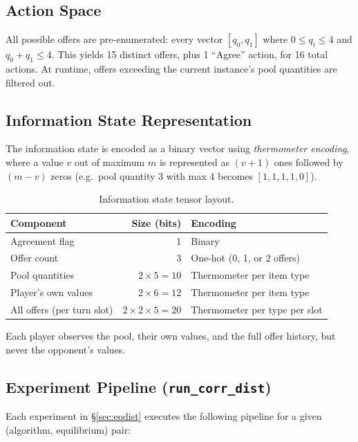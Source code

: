 \documentclass[11pt]{article}
\begin{document}
\subsection{Action Space}

All possible offers are pre-enumerated: every vector $[q_0, q_1]$ where $0 \leq q_i \leq 4$ and $q_0 + q_1 \leq 4$. This yields 15 distinct offers, plus 1 ``Agree'' action, for 16 total actions. At runtime, offers exceeding the current instance's pool quantities are filtered out.

\subsection{Information State Representation}

The information state is encoded as a binary vector using \emph{thermometer encoding}, where a value $v$ out of maximum $m$ is represented as $(v+1)$ ones followed by $(m-v)$ zeros (e.g.\ pool quantity 3 with max 4 becomes $[1,1,1,1,0]$).

\begin{table}[H]
\centering
\begin{tabular}{@{}lrl@{}}
\toprule
\textbf{Component} & \textbf{Size (bits)} & \textbf{Encoding} \\
\midrule
Agreement flag & 1 & Binary \\
Offer count & 3 & One-hot (0, 1, or 2 offers) \\
Pool quantities & $2 \times 5 = 10$ & Thermometer per item type \\
Player's own values & $2 \times 6 = 12$ & Thermometer per item type \\
All offers (per turn slot) & $2 \times 2 \times 5 = 20$ & Thermometer per type per slot \\
\bottomrule
\end{tabular}
\caption{Information state tensor layout.}
\end{table}

Each player observes the pool, their own values, and the full offer history, but never the opponent's values.

\subsection{Experiment Pipeline (\texttt{run\_corr\_dist})}

Each experiment in \S\ref{sec:eqdist} executes the following pipeline for a given (algorithm, equilibrium) pair:
\end{document}
